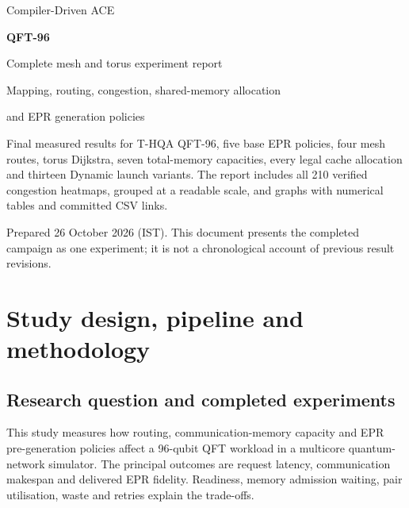 \documentclass[10pt,a4paper,oneside]{report}
\begin{document}
\hypersetup{pageanchor=false}
\begin{titlepage}\centering\vspace*{30mm}
{\Large Compiler-Driven ACE\par}\vspace{10mm}
{\Huge\bfseries QFT-96\par}\vspace{6mm}
{\LARGE Complete mesh and torus experiment report\par}\vspace{8mm}
{\large Mapping, routing, congestion, shared-memory allocation\par}
{\large and EPR generation policies\par}\vfill
\begin{minipage}{.9\linewidth}
Final measured results for T-HQA QFT-96, five base EPR policies, four mesh routes, torus Dijkstra, seven total-memory capacities, every legal cache allocation and thirteen Dynamic launch variants. The report includes all 210 verified congestion heatmaps, grouped at a readable scale, and graphs with numerical tables and committed CSV links.

Prepared 26 October 2026 (IST). This document presents the completed campaign as one experiment; it is not a chronological account of previous result revisions.
\end{minipage}\vspace{20mm}\end{titlepage}
\hypersetup{pageanchor=true}\tableofcontents\clearpage{}

\chapter{Study design, pipeline and methodology}
\section{Research question and completed experiments}
This study measures how routing, communication-memory capacity and EPR pre-generation policies affect a 96-qubit QFT workload in a multicore quantum-network simulator. The principal outcomes are request latency, communication makespan and delivered EPR fidelity. Readiness, memory admission waiting, pair utilisation, waste and retries explain the trade-offs.
\end{document}
